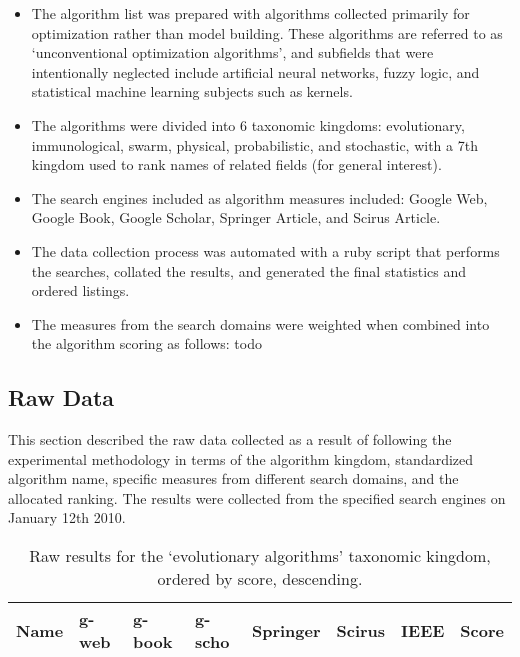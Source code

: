 \documentclass[a4paper, 11pt]{article}
\begin{document}
\begin{itemize}
	\item The algorithm list was prepared with algorithms collected primarily for optimization rather than model building. These algorithms are referred to as `unconventional optimization algorithms', and subfields that were intentionally neglected include artificial neural networks, fuzzy logic, and statistical machine learning subjects such as kernels.
	\item The algorithms were divided into 6 taxonomic kingdoms: evolutionary, immunological, swarm, physical, probabilistic, and stochastic, with a 7th kingdom used to rank names of related fields (for general interest).
	\item The search engines included as algorithm measures included: Google Web, Google Book, Google Scholar, Springer Article, and Scirus Article.
	\item The data collection process was automated with a ruby script that performs the searches, collated the results, and generated the final statistics and ordered listings.
	\item The measures from the search domains were weighted when combined into the algorithm scoring as follows: todo
\end{itemize}

% 
% 
\subsection{Raw Data}
This section described the raw data collected as a result of following the experimental methodology in terms of the algorithm kingdom, standardized algorithm name, specific measures from different search domains, and the allocated ranking. The results were collected from the specified search engines on January 12th 2010.

\begin{table}[ht]
	\centering\small
		\begin{tabularx}{\textwidth}{Xlllllll}
		\toprule
		\textbf{Name} & \textbf{g-web} & \textbf{g-book} & \textbf{g-scho} & \textbf{Springer} & \textbf{Scirus} & \textbf{IEEE} & \textbf{Score} \\ 
		\toprule
		
		\bottomrule
		\end{tabularx}	
	\caption{Raw results for the `evolutionary algorithms' taxonomic kingdom, ordered by score, descending.}
	\label{tab:evolutionary}
\end{table}
\end{document}
